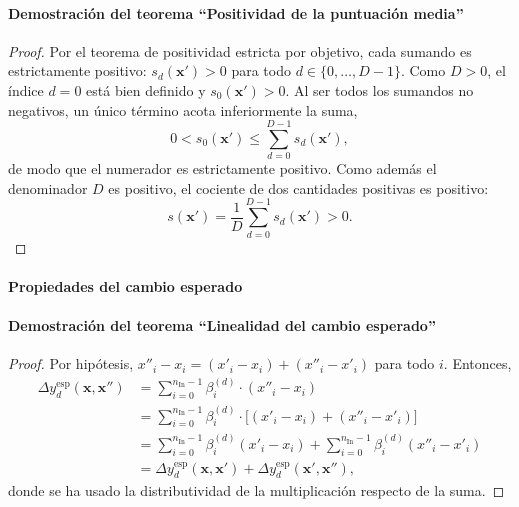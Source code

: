 \documentclass[12pt]{report} %
\begin{document}
\paragraph*{Demostración del teorema ``Positividad de la puntuación media''}
\begin{proof}
    Por el teorema de positividad estricta por objetivo, cada sumando es estrictamente positivo: $s_d(\mathbf{x}') > 0$ para todo $d \in \{0, \ldots, D-1\}$. Como $D > 0$, el índice $d = 0$ está bien definido y $s_0(\mathbf{x}') > 0$. Al ser todos los sumandos no negativos, un único término acota inferiormente la suma,
    $$0 < s_0(\mathbf{x}') \leq \sum_{d=0}^{D-1} s_d(\mathbf{x}'),$$
    de modo que el numerador es estrictamente positivo. Como además el denominador $D$ es positivo, el cociente de dos cantidades positivas es positivo:
    $$s(\mathbf{x}') = \frac{1}{D}\sum_{d=0}^{D-1} s_d(\mathbf{x}') > 0.$$
\end{proof}

\paragraph*{Propiedades del cambio esperado}

\paragraph*{Demostración del teorema ``Linealidad del cambio esperado''}
\begin{proof}
    Por hipótesis, $x''_i - x_i = (x'_i - x_i) + (x''_i - x'_i)$ para todo $i$. Entonces,
    \begin{align*}
        \Delta y_d^{\text{esp}}(\mathbf{x}, \mathbf{x}'')
         & = \sum_{i=0}^{n_{\text{In}}-1} \beta_i^{(d)} \cdot (x''_i - x_i)                                                      \\
         & = \sum_{i=0}^{n_{\text{In}}-1} \beta_i^{(d)} \cdot \bigl[(x'_i - x_i) + (x''_i - x'_i)\bigr]                          \\
         & = \sum_{i=0}^{n_{\text{In}}-1} \beta_i^{(d)} (x'_i - x_i) + \sum_{i=0}^{n_{\text{In}}-1} \beta_i^{(d)} (x''_i - x'_i) \\
         & = \Delta y_d^{\text{esp}}(\mathbf{x}, \mathbf{x}') + \Delta y_d^{\text{esp}}(\mathbf{x}', \mathbf{x}''),
    \end{align*}
    donde se ha usado la distributividad de la multiplicación respecto de la suma.
\end{proof}
\end{document}
